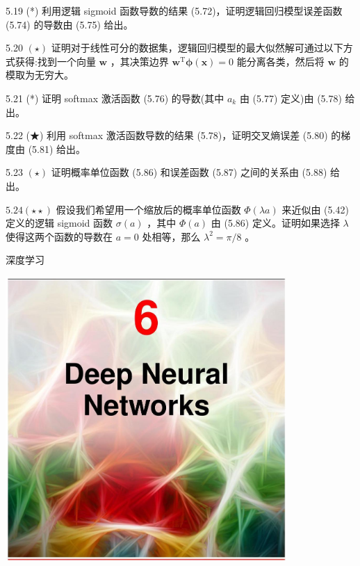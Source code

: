 \documentclass[10pt]{report}
\begin{document}
5.19 (*) 利用逻辑 sigmoid 函数导数的结果 (5.72)，证明逻辑回归模型误差函数 (5.74) 的导数由 (5.75) 给出。

5.20 \(\left( \star \right)\) 证明对于线性可分的数据集，逻辑回归模型的最大似然解可通过以下方式获得:找到一个向量 \(\mathbf{w}\) ，其决策边界 \({\mathbf{w}}^{\mathrm{T}}\mathbf{\phi }\left( \mathbf{x}\right)  = 0\) 能分离各类，然后将 \(\mathbf{w}\) 的模取为无穷大。

5.21 (*) 证明 softmax 激活函数 (5.76) 的导数(其中 \({a}_{k}\) 由 (5.77) 定义)由 (5.78) 给出。

5.22 (★) 利用 softmax 激活函数导数的结果 (5.78)，证明交叉熵误差 (5.80) 的梯度由 (5.81) 给出。

5.23 \(\left( \star \right)\) 证明概率单位函数 (5.86) 和误差函数 (5.87) 之间的关系由 (5.88) 给出。

\({5.24}\left( {\star  \star  }\right)\) 假设我们希望用一个缩放后的概率单位函数 \(\Phi \left( {\lambda a}\right)\) 来近似由 (5.42) 定义的逻辑 sigmoid 函数 \(\sigma \left( a\right)\) ，其中 \(\Phi \left( a\right)\) 由 (5.86) 定义。证明如果选择 \(\lambda\) 使得这两个函数的导数在 \(a = 0\) 处相等，那么 \({\lambda }^{2} = \pi /8\) 。

深度学习

\begin{center}
\includegraphics[max width=0.8\textwidth]{images/0194e279-9b28-703a-88f4-c3ac21e2010d_190_473_349_1075_1088_0.jpg}
\end{center}
\hspace*{3em} 
\end{document}
